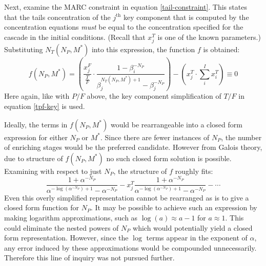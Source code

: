 \documentclass[preprint,12pt]{elsarticle}
\newcommand{\jth}[0]{$j^{\mbox{th}}$ }
\begin{document}
Next, examine the MARC constraint in equation \ref{tail-constraint}.  This states that
the tails concentration of the \jth key component that is computed by the concentration
equations \emph{must} be equal to the concentration specified for the cascade in the
initial conditions.  (Recall that $x_j^T$ is one of the known parameters.)  
Substituting $N_T(N_P, M^*)$ into this expression, the function $f$ is obtained:
\begin{equation}
f(N_P,M^*) =
\left(\frac{x_j^F}{\frac{T}{F}} \cdot \frac{1 - \beta_i^{-N_P}}
                                           {\beta_j^{N_T(N_P,M^*)+1} - \beta_j^{-N_P}} \right)
- \left(x_j^T\cdot\sum_i^{I} x_i^T\right) \equiv 0
\end{equation}
Here again, like with $P/F$ above, the key component simplification of $T/F$ in 
equation \ref{tpf-key} is used.

Ideally, the terms in $f(N_P,M^*)$ would be rearrangeable into a closed form expression
for either $N_P$ or $M^*$.  Since there are fewer instances of $N_P$, the number of
enriching stages would be the preferred candidate.  However from Galois theory, 
due to structure of $f(N_P,M^*)$ no such closed form solution is possible.  Examining
with respect to just $N_P$, the structure of $f$ roughly fits:
\begin{equation}
\frac{1 + \alpha^{-N_P}}{\alpha^{-\log(\alpha^{-N_P})+1} - \alpha^{-N_P}} - x_j^T
    \frac{1 + \alpha^{-N_P}}{\alpha^{-\log(\alpha^{-N_P})+1} - \alpha^{-N_P}} -
    \cdots 
\end{equation}
Even this overly simplified representation cannot be rearranged as is to give a 
closed form function for $N_P$.  It may be possible to achieve such an expression 
by making logarithm approximations, such as $\log(a) \approx a - 1$ for $a\approx1$.  
This could 
eliminate the nested powers of $N_P$ which would potentially yield
a closed form representation.  However, since the $\log$ terms appear in the exponent
of $\alpha$, any error induced by these approximations would be compounded 
unnecessarily.  Therefore this line of inquiry was not pursued further.
\end{document}

